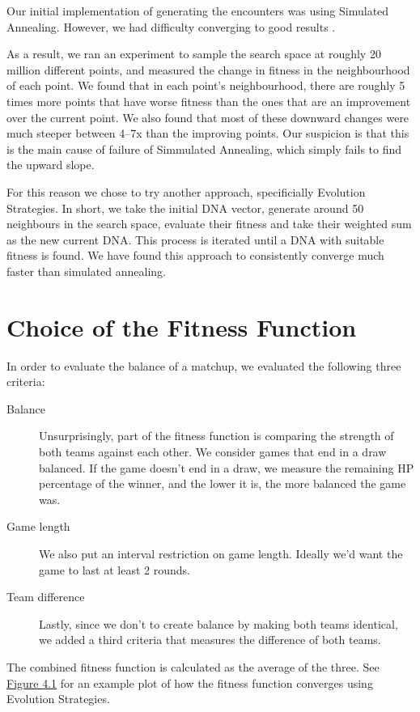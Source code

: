 Our initial implementation of generating the encounters was using Simulated
Annealing. However, we had difficulty converging to good results .

As a result, we ran an experiment to sample the search space at roughly 20
million different points, and measured the change in fitness in the
neighbourhood of each point. We found that in each point's neighbourhood,
there are roughly 5 times more points that have worse fitness than the ones
that are an improvement over the current point. We also found that most of
these downward changes were much steeper between 4--7x than the improving
points. Our suspicion is that this is the main cause of failure of
Simmulated Annealing, which simply fails to find the upward slope.

For this reason we chose to try another approach, specificially Evolution
Strategies. In short, we take the initial DNA vector, generate around 50
neighbours in the search space, evaluate their fitness and take their weighted
sum as the new current DNA\@. This process is iterated until a DNA with
suitable fitness is found. We have found this approach to consistently converge
much faster than simulated annealing.

\section{Choice of the Fitness Function}

In order to evaluate the balance of a matchup, we evaluated the following three
criteria:

\begin{description}
\item [Balance] Unsurprisingly, part of the fitness function is comparing the
  strength of both teams against each other.  We consider games that end in a
    draw balanced.  If the game doesn't end in a draw, we measure the remaining
    HP percentage of the winner, and the lower it is, the more balanced the
    game was.
\item [Game length] We also put an interval restriction on game length. Ideally
  we'd want the game to last at least 2 rounds.
\item [Team difference] Lastly, since we don't to create balance by making both
  teams identical, we added a third criteria that measures the difference of
    both teams.
\end{description}

The combined fitness function is calculated as the average of the three. See \hyperref[fig:converging-es]{Figure 4.1} for an example
plot of how the fitness function converges using Evolution Strategies.

